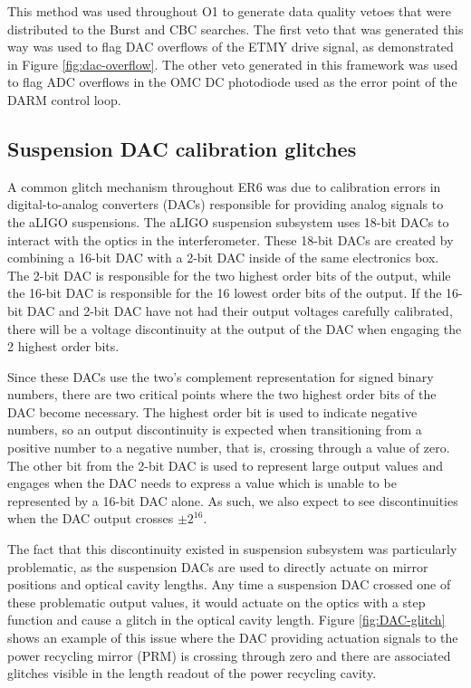 This method was used throughout O1 to generate data quality vetoes that 
were distributed to the Burst and CBC searches. The first veto that was 
generated this way was used to flag DAC overflows of the ETMY drive signal, 
as demonstrated 
in Figure \ref{fig:dac-overflow}. The other veto generated in this framework 
was used to flag ADC overflows in the OMC DC photodiode used as the error 
point of the DARM control loop. 

\subsection{Suspension DAC calibration glitches}

A common glitch mechanism throughout ER6 was due to calibration errors in 
digital-to-analog converters (DACs) responsible for providing analog signals 
to the aLIGO suspensions. The aLIGO suspension subsystem uses 18-bit DACs 
to interact with the optics in the interferometer. These 18-bit DACs are 
created by combining a 16-bit DAC with a 2-bit DAC inside of the same 
electronics box. The 2-bit DAC is responsible for the two highest order 
bits of the output, while the 16-bit DAC is responsible for the 16 lowest 
order bits of the output. If the 16-bit DAC and 2-bit DAC have not had 
their output voltages carefully calibrated, there will be a voltage discontinuity 
at the output of the DAC when engaging the 2 highest order bits. 

Since these DACs use the two's complement 
representation for signed binary numbers, there are two critical points 
where the two highest order bits of the DAC become necessary. The highest 
order bit is used to indicate negative numbers, so an output discontinuity 
is expected when transitioning from a positive number to a negative number, 
that is, crossing through a value of zero.  
The other bit from the 2-bit DAC is used to represent large output values and 
engages when the DAC needs to express a value which is unable to be 
represented by a 16-bit DAC alone. As such, we also 
expect to see discontinuities when the DAC output crosses $\pm2^{16}$. 

The fact that this discontinuity existed in suspension subsystem was 
particularly problematic, as the suspension DACs are used to directly 
actuate on mirror positions and optical cavity lengths. Any time a 
suspension DAC crossed one of these problematic output values, it would 
actuate on the optics with a step function and cause a glitch in the 
optical cavity length. Figure \ref{fig:DAC-glitch} shows an example of 
this issue where the DAC providing actuation signals to the power recycling 
mirror (PRM) is crossing through zero and there are associated glitches 
visible in the length readout of the power recycling cavity.

